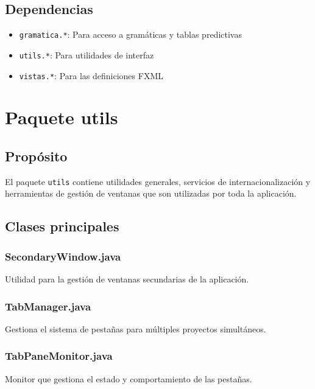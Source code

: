 \subsection{Dependencias}

\begin{itemize}
    \item \texttt{gramatica.*}: Para acceso a gramáticas y tablas predictivas
    \item \texttt{utils.*}: Para utilidades de interfaz
    \item \texttt{vistas.*}: Para las definiciones FXML
\end{itemize}

\section{Paquete utils}

\subsection{Propósito}

El paquete \texttt{utils} contiene utilidades generales, servicios de internacionalización y herramientas de gestión de ventanas que son utilizadas por toda la aplicación.

\subsection{Clases principales}

\subsubsection{SecondaryWindow.java}

Utilidad para la gestión de ventanas secundarias de la aplicación.

\subsubsection{TabManager.java}

Gestiona el sistema de pestañas para múltiples proyectos simultáneos.

\subsubsection{TabPaneMonitor.java}

Monitor que gestiona el estado y comportamiento de las pestañas.

